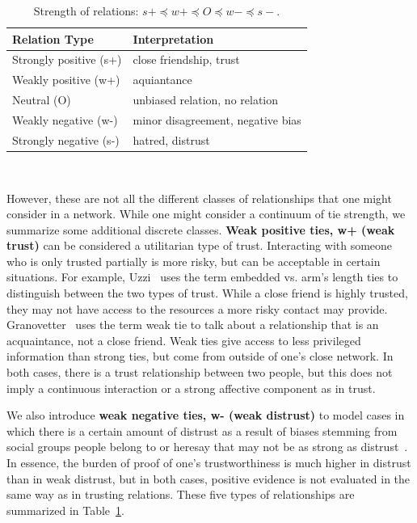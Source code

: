 \begin{table} [htbp!]
\begin{center}
\begin{tabular}{p{1.6in}p{1.6in} }
Relation Type & Interpretation \\ \hline
Strongly positive (s+) & close friendship, trust  \\ 
Weakly positive (w+) & aquiantance \\
Neutral (O) & unbiased relation, no relation  \\
Weakly negative (w-) & minor disagreement, negative bias  \\
Strongly negative (s-) & hatred, distrust  
\end{tabular}\\\vspace{1mm}
\caption{\label{ref:rel_types}Strength of relations: $s+\preceq w+\preceq O\preceq w- \preceq s-$.}
\end{center}
\end{table}

However, these are not all the different classes of relationships that
one might consider in a network. While one might consider a continuum
of tie strength, we summarize some additional discrete classes. {\bf
  Weak positive ties, w+ (weak trust)} can be considered a utilitarian
type of trust. Interacting with someone who is only trusted partially is
more risky, but can be acceptable in certain situations. For example,
Uzzi~\cite{Uzzi:1996} uses the term embedded vs. arm's length ties to
distinguish between the two types of trust. While a close friend is
highly trusted, they may not have access to the resources a more risky
contact may provide. Granovetter~\cite{Granovetter:1973} uses the term
weak tie to talk about a relationship that is an acquaintance, not a
close friend. Weak ties give access to less privileged information
than strong ties, but come from outside of one's close network. In
both cases, there is a trust relationship between two people, but this
does not imply a continuous interaction or a strong affective
component as in trust.

We also introduce {\bf weak negative ties, w- (weak distrust)} to
model cases in which there is a certain amount of distrust as a result
of biases stemming from social groups people belong to or heresay that
may not be as strong as distrust~\cite{Ames:2011}. In essence, the
burden of proof of one's trustworthiness is much higher in distrust
than in weak distrust, but in both cases, positive evidence is not
evaluated in the same way as in trusting relations. These five types
of relationships are summarized in Table~\ref{ref:rel_types}.


